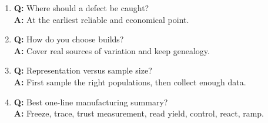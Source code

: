 \begin{enumerate}
\item \textbf{Q:} Where should a defect be caught?\\
\textbf{A:} At the earliest reliable and economical point.
\item \textbf{Q:} How do you choose builds?\\
\textbf{A:} Cover real sources of variation and keep genealogy.
\item \textbf{Q:} Representation versus sample size?\\
\textbf{A:} First sample the right populations, then collect enough data.
\item \textbf{Q:} Best one-line manufacturing summary?\\
\textbf{A:} Freeze, trace, trust measurement, read yield, control, react, ramp.
\end{enumerate}

